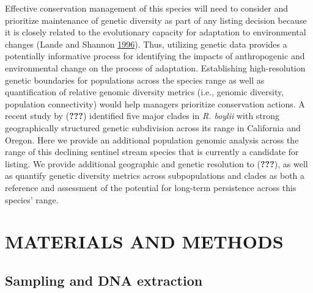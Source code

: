 \documentclass[proquest,12pt,final]{ucthesis-CA2012} %
\begin{document}
\begin{ucmainmatter}
Effective conservation management of this species will need to consider
and prioritize maintenance of genetic diversity as part of any listing
decision because it is closely related to the evolutionary capacity for
adaptation to environmental changes (Lande and Shannon
\protect\hyperlink{ref-lande_role_1996}{1996}). Thus, utilizing genetic
data provides a potentially informative process for identifying the
impacts of anthropogenic and environmental change on the process of
adaptation. Establishing high-resolution genetic boundaries for
populations across the species range as well as quantification of
relative genomic diversity metrics (i.e., genomic diversity, population
connectivity) would help managers prioritize conservation actions. A
recent study by ({\textbf{???}}) identified five major clades in
\emph{R. boylii} with strong geographically structured genetic
subdivision across its range in California and Oregon. Here we provide
an additional population genomic analysis across the range of this
declining sentinel stream species that is currently a candidate for
listing. We provide additional geographic and genetic resolution to
({\textbf{???}}), as well as quantify genetic diversity metrics across
subpopulations and clades as both a reference and assessment of the
potential for long-term persistence across this species' range.

\hypertarget{materials-and-methods-1}{%
\section{MATERIALS AND METHODS}\label{materials-and-methods-1}}

\hypertarget{sampling-and-dna-extraction-1}{%
\subsection{Sampling and DNA
extraction}\label{sampling-and-dna-extraction-1}}


\end{ucmainmatter}
\end{document}
